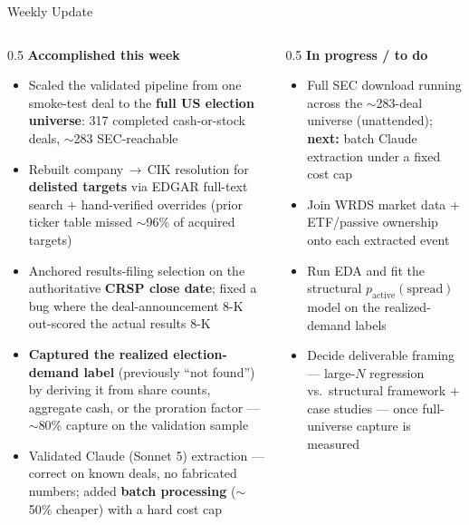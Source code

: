\documentclass[aspectratio=169,10pt]{beamer}
\begin{document}
\begin{frame}{Weekly Update}
  \begin{columns}[T]
    \begin{column}{0.5\textwidth}
      {\bfseries\color{navy}Accomplished this week}
      \begin{itemize}\small
        \item Scaled the validated pipeline from one smoke-test deal to the \textbf{full US election universe}: 317 completed cash-or-stock deals, $\sim$283 SEC-reachable
        \item Rebuilt company\,\(\rightarrow\)\,CIK resolution for \textbf{delisted targets} via EDGAR full-text search + hand-verified overrides (prior ticker table missed $\sim$96\% of acquired targets)
        \item Anchored results-filing selection on the authoritative \textbf{CRSP close date}; fixed a bug where the deal-announcement 8-K out-scored the actual results 8-K
        \item \textbf{Captured the realized election-demand label} (previously ``not found'') by deriving it from share counts, aggregate cash, or the proration factor --- $\sim$80\% capture on the validation sample
        \item Validated Claude (Sonnet 5) extraction --- correct on known deals, no fabricated numbers; added \textbf{batch processing} ($\sim$50\% cheaper) with a hard cost cap
      \end{itemize}
    \end{column}
    \begin{column}{0.5\textwidth}
      {\bfseries\color{navy}In progress / to do}
      \begin{itemize}\small
        \item Full SEC download running across the $\sim$283-deal universe (unattended); \textbf{next:} batch Claude extraction under a fixed cost cap
        \item Join WRDS market data + ETF/passive ownership onto each extracted event
        \item Run EDA and fit the structural $p_{\text{active}}(\text{spread})$ model on the realized-demand labels
        \item Decide deliverable framing --- large-$N$ regression vs.\ structural framework + case studies --- once full-universe capture is measured
      \end{itemize}
    \end{column}
  \end{columns}
\end{frame}
\end{document}
